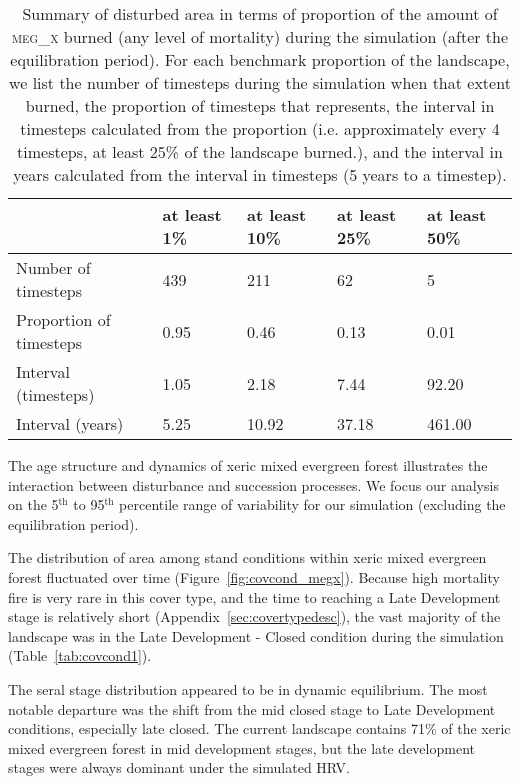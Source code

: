 \begin{table}[!htbp]
\small
\centering
\caption{Summary of disturbed area in terms of proportion of the amount of \textsc{meg\_x} burned (any level of mortality) during the simulation (after the equilibration period). For each benchmark proportion of the landscape, we list the number of timesteps during the simulation when that extent burned, the proportion of timesteps that represents, the interval in timesteps calculated from the proportion (i.e. approximately every 4 timesteps, at least 25\% of the landscape burned.), and the interval in years calculated from the interval in timesteps (5 years to a timestep).}
\label{tab:darea_atleast_megx}
\begin{tabular}{@{}lllll@{}}
                        & at least 1\% & at least 10\% & at least 25\% & at least 50\% \\ \midrule
Number of timesteps     & 439          & 211           & 62            & 5             \\
Proportion of timesteps & 0.95         & 0.46          & 0.13          & 0.01          \\
Interval (timesteps)    & 1.05         & 2.18          & 7.44          & 92.20         \\
Interval (years)        & 5.25         & 10.92         & 37.18         & 461.00       \\ \bottomrule
\end{tabular}
\end{table}

The age structure and dynamics of xeric mixed evergreen forest illustrates the interaction between disturbance and succession processes. We focus our analysis on the 5$^{\text{th}}$ to 95$^{\text{th}}$ percentile range of variability for our simulation (excluding the equilibration period). %

The distribution of area among stand conditions within xeric mixed evergreen forest fluctuated over time (Figure~\ref{fig:covcond_megx}). Because high mortality fire is very rare in this cover type, and the time to reaching a Late Development stage is relatively short (Appendix~\ref{sec:covertypedesc}), the vast majority of the landscape was in the Late Development - Closed condition during the simulation (Table~\ref{tab:covcond1}).  %

The seral stage distribution appeared to be in dynamic equilibrium. The most notable departure was the shift from the mid closed stage to Late Development conditions, especially late closed. The current landscape contains 71\% of the xeric mixed evergreen forest in mid development stages, but the late development stages were always dominant under the simulated HRV. 

